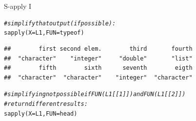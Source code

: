 \documentclass[xcolor=table,           xcolor=dvipsnames]{beamer}\usepackage[]{graphicx}\usepackage[]{color}
\makeatletter
\newcommand{\hlcom}[1]{\textcolor[rgb]{0,0.392,0}{\textit{#1}}}
\newcommand{\hlstd}[1]{\textcolor[rgb]{0,0,0}{#1}}
\newcommand{\hlkwc}[1]{\textcolor[rgb]{1,0,1}{#1}}
\newcommand{\hlkwd}[1]{\textcolor[rgb]{0,0,1}{#1}}
\newenvironment{kframe}{%
 \def\at@end@of@kframe{}%
 \ifinner\ifhmode%
  \def\at@end@of@kframe{\end{minipage}}%
  \begin{minipage}{\columnwidth}%
 \fi\fi%
 \def\FrameCommand##1{\hskip\@totalleftmargin \hskip-\fboxsep
 \colorbox{shadecolor}{##1}\hskip-\fboxsep
     \hskip-\linewidth \hskip-\@totalleftmargin \hskip\columnwidth}%
 \MakeFramed {\advance\hsize-\width
   \@totalleftmargin\z@ \linewidth\hsize
   \@setminipage}}%
 {\par\unskip\endMakeFramed%
 \at@end@of@kframe}
\newenvironment{knitrout}{}{} %
\makeatother
\begin{document}

\begin{frame}[fragile]{S-apply I}
\begin{knitrout}
\color{fgcolor}\begin{kframe}
\begin{alltt}
\hlcom{# simplify that output (if possible):}
    \hlkwd{sapply}\hlstd{(}\hlkwc{X}\hlstd{=L1,} \hlkwc{FUN}\hlstd{=typeof)}
\end{alltt}
\begin{verbatim}
##        first second elem.        third       fourth 
##  "character"    "integer"     "double"       "list" 
##        fifth        sixth      seventh        eigth 
##  "character"  "character"    "integer"  "character"
\end{verbatim}
\end{kframe}
\end{knitrout}
\pause
\begin{knitrout}
\color{fgcolor}\begin{kframe}
\begin{alltt}
\hlcom{# simplifying not possible if FUN(L1[[1]]) and FUN(L1[[2]])}
\hlcom{# return different results:}
\hlkwd{sapply}\hlstd{(}\hlkwc{X}\hlstd{=L1,} \hlkwc{FUN}\hlstd{=head)}
\end{alltt}
\end{kframe}
\end{knitrout}
\end{frame}

\end{document}
